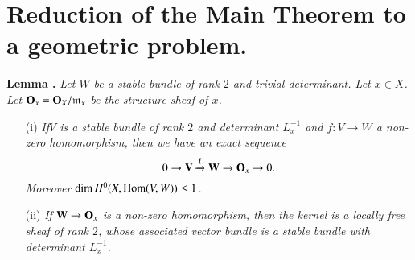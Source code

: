 \section{Reduction of the Main Theorem to a geometric problem.}\label{art17-sec7}

\medskip
\noindent
{\bf Lemma .\label{art17-lem7.1}}
{\em Let $W$ be a stable bundle of rank $2$ and trivial determinant. Let $x\in X$. Let $\mathbf{O}_{x}=\mathbf{O}_{X}/\mathfrak{m}_{x}$ be the structure sheaf of $x$.}
\begin{itemize}
\item[\rm(i)] {\em If\pageoriginale $V$ is a stable bundle of rank $2$ and determinant $L^{-1}_{x}$ and $f:V\to W$ a non-zero homomorphism, then we have an exact sequence}
$$
0\to \mathbf{V}\xrightarrow{\mathbf{f}}\mathbf{W}\to \mathbf{O}_{x}\to 0.
$$
{\em Moreover $\dim H^{0}(X,\operatorname{\mathrm{Hom}}(V,W))\leq 1$.}

\item[\rm(ii)] {\em If $\mathbf{W}\to \mathbf{O}_{x}$ is a non-zero homomorphism, then the kernel is a locally free sheaf of rank $2$, whose associated vector bundle is a stable bundle with determinant $L^{-1}_{x}$.}
\end{itemize}


